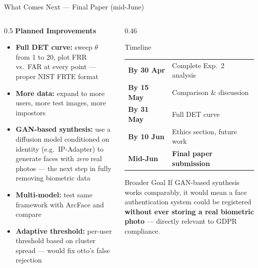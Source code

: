 \documentclass[aspectratio=169]{beamer}
\begin{document}
\begin{frame}{What Comes Next — Final Paper (mid-June)}

\begin{columns}[T]
\begin{column}{0.5\textwidth}
    \textbf{Planned Improvements}
    \begin{itemize}
        \item \textbf{Full DET curve:} sweep $\theta$ from 1 to 20, plot FRR vs.\ FAR at every point — proper NIST FRTE format
        \item \textbf{More data:} expand to more users, more test images, more impostors
        \item \textbf{GAN-based synthesis:} use a diffusion model conditioned on identity (e.g.\ IP-Adapter) to generate faces with \textit{zero} real photos — the next step in fully removing biometric data
        \item \textbf{Multi-model:} test same framework with ArcFace and compare
        \item \textbf{Adaptive threshold:} per-user threshold based on cluster spread — would fix otto's false rejection
    \end{itemize}
\end{column}
\begin{column}{0.46\textwidth}
    \begin{block}{Timeline}
        \small
        \begin{tabular}{ll}
        \textbf{By 30 Apr} & Complete Exp.\ 2 analysis \\
        \textbf{By 15 May} & Comparison \& discussion \\
        \textbf{By 31 May} & Full DET curve \\
        \textbf{By 10 Jun} & Ethics section, future work \\
        \textbf{Mid-Jun}   & \textbf{Final paper submission} \\
        \end{tabular}
    \end{block}
    \vspace{8pt}
    \begin{exampleblock}{Broader Goal}
        \small
        If GAN-based synthesis works comparably, it would mean a face authentication system could be registered \textbf{without ever storing a real biometric photo} — directly relevant to GDPR compliance.
    \end{exampleblock}
\end{column}
\end{columns}
\end{frame}
\end{document}
